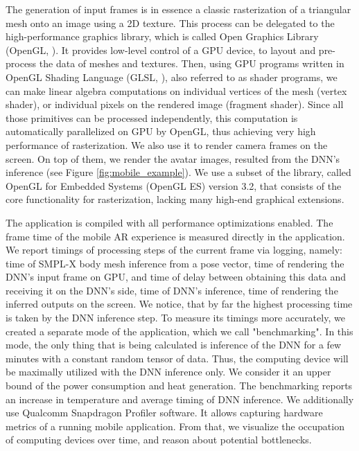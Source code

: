 The generation of input frames is in essence a classic rasterization of a triangular mesh onto an image using a 2D texture. This process can be delegated to the high-performance graphics library, which is called Open Graphics Library (OpenGL, \cite{aux:opengl22}). It provides low-level control of a GPU device, to layout and pre-process the data of meshes and textures. Then, using GPU programs written in OpenGL Shading Language (GLSL, \cite{aux:glsl21}), also referred to as shader programs, we can make linear algebra computations on individual vertices of the mesh (vertex shader), or individual pixels on the rendered image (fragment shader). Since all those primitives can be processed independently, this computation is automatically parallelized on GPU by OpenGL, thus achieving very high performance of rasterization. We also use it to render camera frames on the screen. On top of them, we render the avatar images, resulted from the DNN's inference (see Figure \ref{fig:mobile_example}). We use a subset of the library, called OpenGL for Embedded Systems (OpenGL ES) version 3.2, that consists of the core functionality for rasterization, lacking many high-end graphical extensions.

The application is compiled with all performance optimizations enabled. The frame time of the mobile AR experience is measured directly in the application. We report timings of processing steps of the current frame via logging, namely: time of SMPL-X body mesh inference from a pose vector, time of rendering the DNN's input frame on GPU, and time of delay between obtaining this data and receiving it on the DNN's side, time of DNN's inference, time of rendering the inferred outputs on the screen. We notice, that by far the highest processing time is taken by the DNN inference step. To measure its timings more accurately, we created a separate mode of the application, which we call "benchmarking". In this mode, the only thing that is being calculated is inference of the DNN for a few minutes with a constant random tensor of data. Thus, the computing device will be maximally utilized with the DNN inference only. We consider it an upper bound of the power consumption and heat generation. The benchmarking reports an increase in temperature and average timing of DNN inference. We additionally use Qualcomm Snapdragon Profiler software. It allows capturing hardware metrics of a running mobile application. From that, we visualize the occupation of computing devices over time, and reason about potential bottlenecks.

